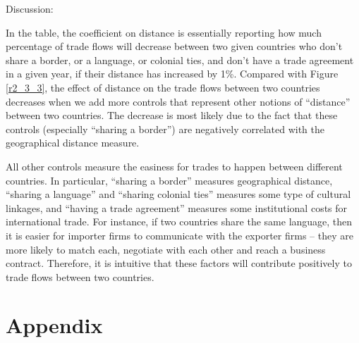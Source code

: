 \documentclass[12pt]{article}
\theoremstyle{definition}
\begin{document}
Discussion:

In the table, the coefficient on distance is essentially reporting how much percentage of trade flows will decrease between two given countries who don't share a border, or a language, or colonial ties, and don't have a trade agreement in a given year, if their distance has increased by 1\%. Compared with Figure \ref{r2_3_3}, the effect of distance on the trade flows between two countries decreases when we add more controls that represent other notions of ``distance'' between two countries. The decrease is most likely due to the fact that these controls (especially ``sharing a border'') are negatively correlated with the geographical distance measure. 

All other controls measure the easiness for trades to happen between different countries. In particular, ``sharing a border'' measures geographical distance, ``sharing a language'' and ``sharing colonial ties'' measures some type of cultural linkages, and ``having a trade agreement'' measures some institutional costs for international trade. For instance, if two countries share the same language, then it is easier for importer firms to communicate with the exporter firms -- they are more likely to match each, negotiate with each other and reach a business contract. Therefore, it is intuitive that these factors will contribute positively to trade flows between two countries. 


\appendix 

\section{Appendix}

\setcounter{figure}{0}
\renewcommand{\thefigure}{A.\arabic{figure}}
\end{document}
